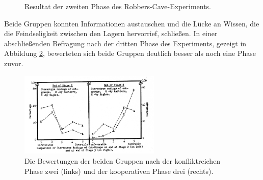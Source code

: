\begin{figure}[htbp]
	\begin{center}
		\caption{Resultat der zweiten Phase des Robbers-Cave-Experiments.}
	\label{fig:phase-zwei}
	\end{center}
\end{figure}

Beide Gruppen konnten Informationen austauschen und die Lücke an Wissen, die die Feindseligkeit zwischen den Lagern hervorrief, schließen. In einer abschließenden Befragung nach der dritten Phase des Experiments, gezeigt in Abbildung \ref{fig:phase-drei}, bewerteten sich beide Gruppen deutlich besser als noch eine Phase zuvor. \\

\begin{figure}[htbp]
	\begin{center}
		\includegraphics[width=0.6\textwidth]{Bilder/phase-drei-ratings.jpg}
		\caption{Die Bewertungen der beiden Gruppen nach der konfliktreichen Phase zwei (links) und der kooperativen Phase drei (rechts).}
		\label{fig:phase-drei}
	\end{center}
\end{figure}


